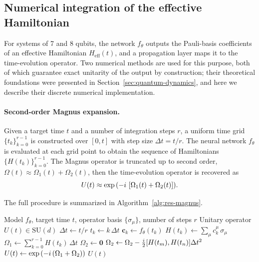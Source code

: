 \subsection{Numerical integration of the effective Hamiltonian}
\label{sec:res-integration}

For systems of 7 and 8 qubits, the network $f_\theta$ outputs the Pauli-basis coefficients of an effective Hamiltonian $H_\mathrm{eff}(t)$, and a propagation layer maps it to the time-evolution operator. Two numerical methods are used for this purpose, both of which guarantee exact unitarity of the output by construction; their theoretical foundations were presented in Section~\ref{sec:quantum-dynamics}, and here we describe their discrete numerical implementation.

\paragraph{Second-order Magnus expansion.}
Given a target time $t$ and a number of integration steps $r$, a uniform time grid $\{t_k\}_{k=0}^{r-1}$ is constructed over $[0, t]$ with step size $\Delta t = t/r$. The neural network $f_\theta$ is evaluated at each grid point to obtain the sequence of Hamiltonians $\{H(t_k)\}_{k=0}^{r-1}$. The Magnus operator is truncated up to second order, $\Omega(t) \approx \Omega_1(t) + \Omega_2(t)$, then the time-evolution operator is recovered as
\begin{equation}
    U(t) \approx \exp\qty(-i\, \left[ \Omega_1(t) + \Omega_2(t) \right]).
\end{equation}

The full procedure is summarized in Algorithm~\ref{alg:res-magnus}.

\begin{algorithm}[htbp]
\caption{Second-order Magnus expansion}
\label{alg:res-magnus}
\begin{algorithmic}[1]
\REQUIRE Model $f_\theta$, target time $t$, operator basis $\{\sigma_\mu\}$,
         number of steps $r$
\ENSURE Unitary operator $U(t) \in \mathrm{SU}(d)$
\STATE $\Delta t \leftarrow t / r$
    \STATE $t_k \leftarrow k\,\Delta t$
    \STATE $\bm{c}_k \leftarrow f_\theta(t_k)$ 
    \STATE $H(t_k) \leftarrow \sum_\mu c_k^\mu\,\sigma_\mu$ 
\ENDFOR
\STATE $\Omega_1 \leftarrow \sum_{k=0}^{r-1} H(t_k)\,\Delta t$
\STATE $\Omega_2 \leftarrow \mathbf{0}$
        \STATE $\Omega_2 \leftarrow \Omega_2
            - \frac{i}{2}\comm{H(t_m)}{H(t_n)}\Delta t^2$
    \ENDFOR
\ENDFOR
\STATE $U(t) \leftarrow \exp\qty(-i\,(\Omega_1 + \Omega_2))$
\RETURN $U(t)$
\end{algorithmic}
\end{algorithm}


